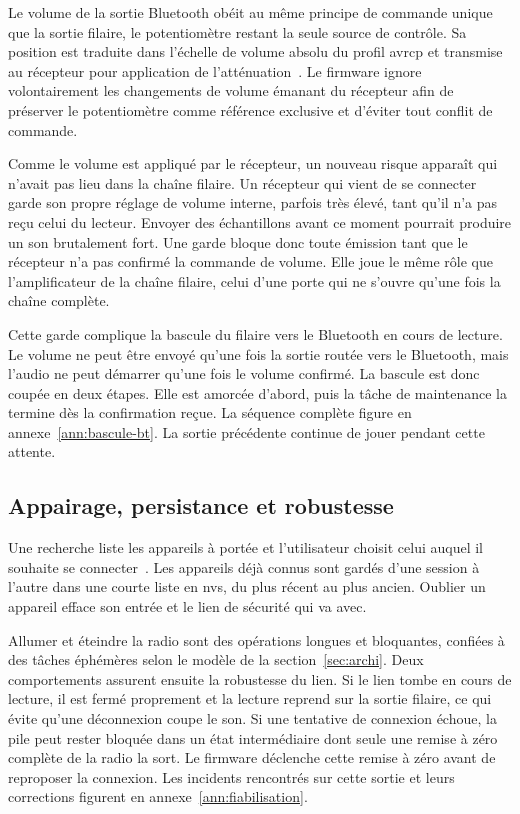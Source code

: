 Le volume de la sortie Bluetooth obéit au même principe de commande unique que la sortie filaire, le potentiomètre restant la seule source de contrôle. Sa position est traduite dans l'échelle de volume absolu du profil \gls{avrcp} et transmise au récepteur pour application de l'atténuation~\cite{ESP32_IDF_guide}. Le firmware ignore volontairement les changements de volume émanant du récepteur afin de préserver le potentiomètre comme référence exclusive et d'éviter tout conflit de commande.

Comme le volume est appliqué par le récepteur, un nouveau risque apparaît qui n'avait pas lieu dans la chaîne filaire. Un récepteur qui vient de se connecter garde son propre réglage de volume interne, parfois très élevé, tant qu'il n'a pas reçu celui du lecteur. Envoyer des échantillons avant ce moment pourrait produire un son brutalement fort. Une garde bloque donc toute émission tant que le récepteur n'a pas confirmé la commande de volume. Elle joue le même rôle que l'amplificateur de la chaîne filaire, celui d'une porte qui ne s'ouvre qu'une fois la chaîne complète.

Cette garde complique la bascule du filaire vers le Bluetooth en cours de lecture. Le volume ne peut être envoyé qu'une fois la sortie routée vers le Bluetooth, mais l'audio ne peut démarrer qu'une fois le volume confirmé. La bascule est donc coupée en deux étapes. Elle est amorcée d'abord, puis la tâche de maintenance la termine dès la confirmation reçue. La séquence complète figure en annexe~\ref{ann:bascule-bt}. La sortie précédente continue de jouer pendant cette attente.

\subsection{Appairage, persistance et robustesse}

Une recherche liste les appareils à portée et l'utilisateur choisit celui auquel il souhaite se connecter~\cite{ESP32_IDF_guide}. Les appareils déjà connus sont gardés d'une session à l'autre dans une courte liste en \gls{nvs}, du plus récent au plus ancien. Oublier un appareil efface son entrée et le lien de sécurité qui va avec.

Allumer et éteindre la radio sont des opérations longues et bloquantes, confiées à des tâches éphémères selon le modèle de la section~\ref{sec:archi}. Deux comportements assurent ensuite la robustesse du lien. Si le lien tombe en cours de lecture, il est fermé proprement et la lecture reprend sur la sortie filaire, ce qui évite qu'une déconnexion coupe le son. Si une tentative de connexion échoue, la pile peut rester bloquée dans un état intermédiaire dont seule une remise à zéro complète de la radio la sort. Le firmware déclenche cette remise à zéro avant de reproposer la connexion. Les incidents rencontrés sur cette sortie et leurs corrections figurent en annexe~\ref{ann:fiabilisation}.